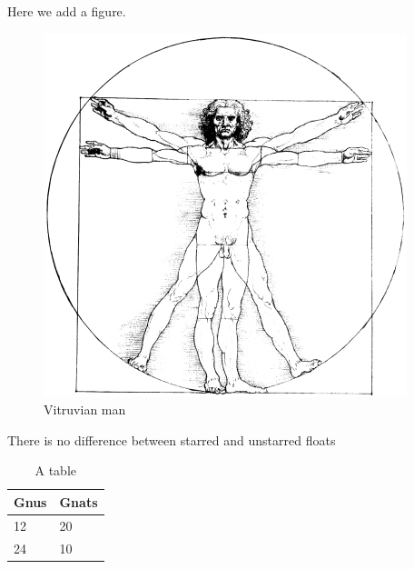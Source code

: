 \documentclass{book}
\begin{document}
\begin{commeditComments}
  Here we add a figure.

  \begin{figure}
    \centering
    \includegraphics[width=\columnwidth]{vitruvian}
    \caption{Vitruvian man}
    \label{fig:vitruvian}
  \end{figure}

  There is no difference between starred and unstarred floats
  \begin{table}
    \centering
    \begin{tabular}{ll}
      \toprule
      Gnus & Gnats\\
      \midrule
      12 & 20\\
      24 & 10\\
      \bottomrule
    \end{tabular}
    \caption{A table}
    \label{tab:table}
  \end{table}

\end{commeditComments}
\end{document}
